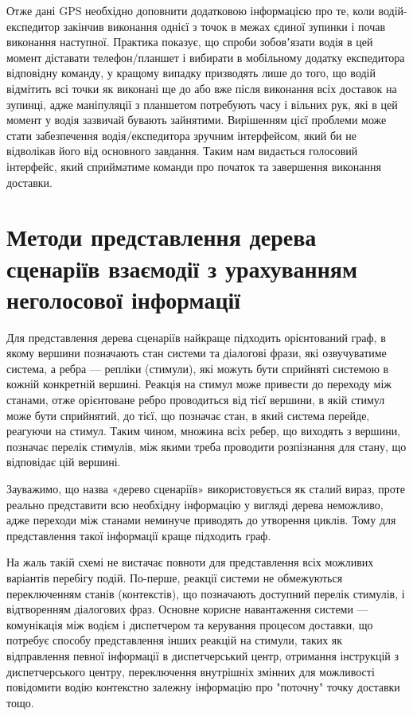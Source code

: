 Отже дані GPS необхідно доповнити додатковою інформацією про те, коли водій-експедитор закінчив виконання однієї з точок в межах єдиної зупинки і почав виконання наступної. Практика показує, що спроби зобовʼязати водія в цей момент діставати телефон/планшет і вибирати в мобільному додатку експедитора відповідну команду, у кращому випадку призводять лише до того, що водій відмітить всі точки як виконані ще до або вже після виконання всіх доставок на зупинці, адже маніпуляції з планшетом потребують часу і вільних рук, які в цей момент у водія зазвичай бувають зайнятими. Вирішенням цієї проблеми може стати забезпечення водія/експедитора зручним інтерфейсом, який би не відволікав його від основного завдання. Таким нам видається голосовий інтерфейс, який сприйматиме команди про початок та завершення виконання доставки.


\section{Методи представлення дерева сценаріїв взаємодії з урахуванням неголосової інформації} \label{sect2_3}

Для представлення дерева сценаріїв найкраще підходить орієнтований граф, в якому вершини позначають стан системи та діалогові фрази, які озвучуватиме система, а ребра --- репліки (стимули), які можуть бути сприйняті системою в кожній конкретній вершині. Реакція на стимул може привести до переходу між станами, отже орієнтоване ребро проводиться від тієї вершини, в якій стимул може бути сприйнятий, до тієї, що позначає стан, в який система перейде, реагуючи на стимул. Таким чином, множина всіх ребер, що виходять з вершини, позначає перелік стимулів, між якими треба проводити розпізнання для стану, що відповідає цій вершині.

Зауважимо, що назва «дерево сценаріїв» використовується як сталий вираз, проте реально представити всю необхідну інформацію у вигляді дерева неможливо, адже переходи між станами неминуче приводять до утворення циклів. Тому для представлення такої інформації краще підходить граф.

На жаль такій схемі не вистачає повноти для представлення всіх можливих варіантів перебігу подій. По-перше, реакції системи не обмежуються переключенням станів (контекстів), що позначають доступний перелік стимулів, і відтворенням діалогових фраз. Основне корисне навантаження системи --- комунікація між водієм і диспетчером та керування процесом доставки, що потребує способу представлення інших реакцій на стимули, таких як відправлення певної інформації в диспетчерський центр, отримання інструкцій з диспетчерського центру, переключення внутрішніх змінних для можливості повідомити водію контекстно залежну інформацію про "поточну" точку доставки тощо.

